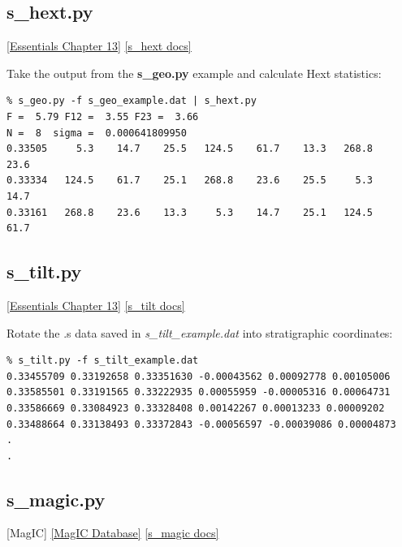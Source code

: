 \documentclass[11pt]{book}
\begin{document}
{

\subsection{s\_hext.py}
\href{http://earthref.org/MAGIC/books/Tauxe/Essentials/WebBook3ch13.html#ch13}{[Essentials Chapter 13]}
\href{https://github.com/PmagPy/PmagPy/blob/master/programs/s_hext.py}{[s\_hext docs]}


Take the output from the {\bf s\_geo.py} example and calculate Hext statistics:

\begin{verbatim}
% s_geo.py -f s_geo_example.dat | s_hext.py
F =  5.79 F12 =  3.55 F23 =  3.66
N =  8  sigma =  0.000641809950
0.33505     5.3    14.7    25.5   124.5    61.7    13.3   268.8    23.6
0.33334   124.5    61.7    25.1   268.8    23.6    25.5     5.3    14.7
0.33161   268.8    23.6    13.3     5.3    14.7    25.1   124.5    61.7

\end{verbatim}


\subsection{s\_tilt.py}
\href{http://earthref.org/MAGIC/books/Tauxe/Essentials/WebBook3ch13.html#ch13}{[Essentials Chapter 13]}
\href{https://github.com/PmagPy/PmagPy/blob/master/programs/s_tilt.py}{[s\_tilt docs]}

Rotate the .s data saved in {\it s\_tilt\_example.dat} into stratigraphic coordinates:

\begin{verbatim}
% s_tilt.py -f s_tilt_example.dat
0.33455709 0.33192658 0.33351630 -0.00043562 0.00092778 0.00105006
0.33585501 0.33191565 0.33222935 0.00055959 -0.00005316 0.00064731
0.33586669 0.33084923 0.33328408 0.00142267 0.00013233 0.00009202
0.33488664 0.33138493 0.33372843 -0.00056597 -0.00039086 0.00004873
.
.
\end{verbatim}


\subsection{s\_magic.py} [MagIC]
\href{#MagICDatabase}{[MagIC Database]}
\href{https://github.com/PmagPy/PmagPy/blob/master/programs/s_magic.py}{[s\_magic docs]}

}
\end{document}
